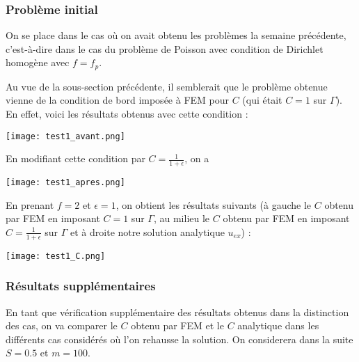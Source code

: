 \subsubsection*{Problème initial}

On se place dans le cas où on avait obtenu les problèmes la semaine précédente, c'est-à-dire dans le cas du problème de Poisson avec condition de Dirichlet homogène avec $f=f_p$. 

Au vue de la sous-section précédente, il semblerait que le problème obtenue vienne de la condition de bord imposée à FEM pour $C$ (qui était $C=1$ sur $\Gamma$). En effet, voici les résultats obtenus avec cette condition :

\begin{minipage}{\linewidth}
	\centering
	\texttt{[image: test1\_avant.png]}
\end{minipage}

En modifiant cette condition par $C=\frac{1}{1+\epsilon}$, on a


\begin{minipage}{\linewidth}
	\centering
	\texttt{[image: test1\_apres.png]}
\end{minipage}

En prenant $f=2$ et $\epsilon=1$, on obtient les résultats suivants (à gauche le $C$ obtenu par FEM en imposant $C=1$ sur $\Gamma$, au milieu le $C$ obtenu par FEM en imposant $C=\frac{1}{1+\epsilon}$ sur $\Gamma$ et à droite notre solution analytique $u_{ex}$) :

\begin{minipage}{\linewidth}
	\centering
	\texttt{[image: test1\_C.png]}
\end{minipage}

\subsubsection*{Résultats supplémentaires}

En tant que vérification supplémentaire des résultats obtenus dans la distinction des cas, on va comparer le $C$ obtenu par FEM et le $C$ analytique dans les différents cas considérés où l'on rehausse la solution. On considerera dans la suite $S=0.5$ et $m=100$.

